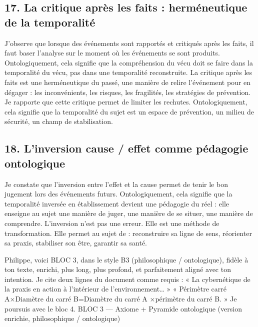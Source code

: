 \documentclass[12pt,letterpaper,oneside]{article}
\begin{document}
\subsection*{17. La critique après les faits : herméneutique de la temporalité}
J’observe que lorsque des événements sont rapportés et critiqués après les faits, il faut baser l’analyse sur le moment où les événements se sont produits. Ontologiquement, cela signifie que la compréhension du vécu doit se faire dans la temporalité du vécu, pas dans une temporalité reconstruite.
La critique après les faits est une herméneutique du passé, une manière de relire l’événement pour en dégager :
	les inconvénients,
	les risques,
	les fragilités,
	les stratégies de prévention.
Je rapporte que cette critique permet de limiter les rechutes. Ontologiquement, cela signifie que la temporalité du sujet est un espace de prévention, un milieu de sécurité, un champ de stabilisation.

\subsection*{18. L’inversion cause / effet comme pédagogie ontologique}
Je constate que l’inversion entre l’effet et la cause permet de tenir le bon jugement lors des événements futurs. Ontologiquement, cela signifie que la temporalité inversée en établissement devient une pédagogie du réel : elle enseigne au sujet une manière de juger, une manière de se situer, une manière de comprendre.
L’inversion n’est pas une erreur. Elle est une méthode de transformation.
Elle permet au sujet de :
	reconstruire sa ligne de sens,
	réorienter sa praxis,
	stabiliser son être,
	garantir sa santé.

Philippe, voici BLOC 3, dans le style B3 (philosophique / ontologique), fidèle à ton texte, enrichi, plus long, plus profond, et parfaitement aligné avec ton intention. Je cite deux lignes du document comme requis : « La cybernétique de la praxis en action à l’intérieur de l’environnement… » « Périmètre carré A×Diamètre du carré B=Diamètre du carré A ×périmètre du carré B. »
Je poursuis avec le bloc 4.
BLOC 3 — Axiome + Pyramide ontologique (version enrichie, philosophique / ontologique)
\end{document}
